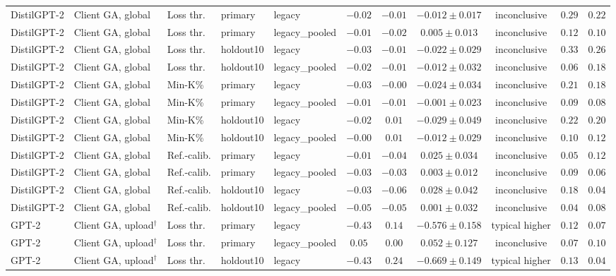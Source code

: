 \begin{table}[t]
\begin{tabular*}{\textwidth}{@{\extracolsep{\fill}}lllllcccccc@{}}
DistilGPT-2 & Client GA, global & Loss thr. & primary & legacy & $-0.02$ & $-0.01$ & $-0.012 \pm 0.017$ & inconclusive & $0.29$ & $0.22$ \\
DistilGPT-2 & Client GA, global & Loss thr. & primary & legacy\_pooled & $-0.01$ & $-0.02$ & $0.005 \pm 0.013$ & inconclusive & $0.12$ & $0.10$ \\
DistilGPT-2 & Client GA, global & Loss thr. & holdout10 & legacy & $-0.03$ & $-0.01$ & $-0.022 \pm 0.029$ & inconclusive & $0.33$ & $0.26$ \\
DistilGPT-2 & Client GA, global & Loss thr. & holdout10 & legacy\_pooled & $-0.02$ & $-0.01$ & $-0.012 \pm 0.032$ & inconclusive & $0.06$ & $0.18$ \\
DistilGPT-2 & Client GA, global & Min-K\% & primary & legacy & $-0.03$ & $-0.00$ & $-0.024 \pm 0.034$ & inconclusive & $0.21$ & $0.18$ \\
DistilGPT-2 & Client GA, global & Min-K\% & primary & legacy\_pooled & $-0.01$ & $-0.01$ & $-0.001 \pm 0.023$ & inconclusive & $0.09$ & $0.08$ \\
DistilGPT-2 & Client GA, global & Min-K\% & holdout10 & legacy & $-0.02$ & $0.01$ & $-0.029 \pm 0.049$ & inconclusive & $0.22$ & $0.20$ \\
DistilGPT-2 & Client GA, global & Min-K\% & holdout10 & legacy\_pooled & $-0.00$ & $0.01$ & $-0.012 \pm 0.029$ & inconclusive & $0.10$ & $0.12$ \\
DistilGPT-2 & Client GA, global & Ref.-calib. & primary & legacy & $-0.01$ & $-0.04$ & $0.025 \pm 0.034$ & inconclusive & $0.05$ & $0.12$ \\
DistilGPT-2 & Client GA, global & Ref.-calib. & primary & legacy\_pooled & $-0.03$ & $-0.03$ & $0.003 \pm 0.012$ & inconclusive & $0.09$ & $0.06$ \\
DistilGPT-2 & Client GA, global & Ref.-calib. & holdout10 & legacy & $-0.03$ & $-0.06$ & $0.028 \pm 0.042$ & inconclusive & $0.18$ & $0.04$ \\
DistilGPT-2 & Client GA, global & Ref.-calib. & holdout10 & legacy\_pooled & $-0.05$ & $-0.05$ & $0.001 \pm 0.032$ & inconclusive & $0.04$ & $0.08$ \\
GPT-2 & Client GA, upload$^{\dagger}$ & Loss thr. & primary & legacy & $-0.43$ & $0.14$ & $-0.576 \pm 0.158$ & typical higher & $0.12$ & $0.07$ \\
GPT-2 & Client GA, upload$^{\dagger}$ & Loss thr. & primary & legacy\_pooled & $0.05$ & $0.00$ & $0.052 \pm 0.127$ & inconclusive & $0.07$ & $0.10$ \\
GPT-2 & Client GA, upload$^{\dagger}$ & Loss thr. & holdout10 & legacy & $-0.43$ & $0.24$ & $-0.669 \pm 0.149$ & typical higher & $0.13$ & $0.04$ \\

\end{tabular*}
\end{table}
